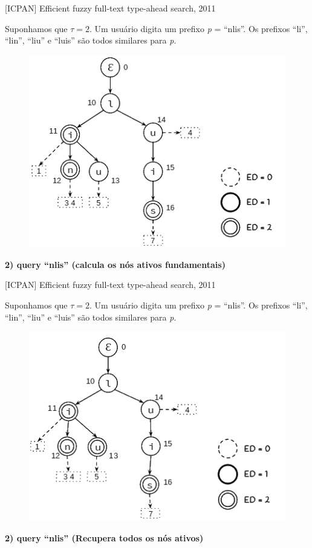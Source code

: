 \documentclass[11pt]{beamer}
\begin{document}
\begin{frame}{[ICPAN] Efficient fuzzy full-text type-ahead search, 2011}
    
    \small
    Suponhamos que $\tau = 2$. Um usuário digita um prefixo \textit{p} = ``nlis''. Os prefixos ``li'', ``lin'', ``liu'' e ``luis'' são todos similares para \textit{p}.

    \begin{figure}
      \includegraphics[scale=0.50]{pictures/icpan_5.png}
      \centering
    \end{figure}
    
    \textbf{2) query ``nlis'' (calcula os nós ativos fundamentais)}
    
\end{frame}

\begin{frame}{[ICPAN] Efficient fuzzy full-text type-ahead search, 2011}
    
    \small
    Suponhamos que $\tau = 2$. Um usuário digita um prefixo \textit{p} = ``nlis''. Os prefixos ``li'', ``lin'', ``liu'' e ``luis'' são todos similares para \textit{p}.

    \begin{figure}
      \includegraphics[scale=0.50]{pictures/ipcan_full_4.png}
      \centering
    \end{figure}
    
    \textbf{2) query ``nlis'' (Recupera todos os nós ativos)}
    
\end{frame}
\end{document}
